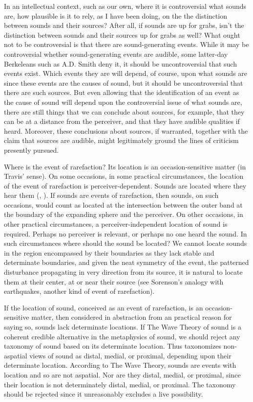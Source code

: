 \documentclass[12pt]{article}
\begin{document}
In an intellectual context, such as our own, where it is controversial what sounds are, how plausible is it to rely, as I have been doing, on the the distinction between sounds and their sources? After all, if sounds are up for grabs, isn’t the distinction between sounds and their sources up for grabs as well? What ought not to be controversial is that there are sound-generating events. While it may be controversial whether sound-generating events are audible, some latter-day Berkeleans such as A.D. Smith \citeyearpar{Smith:2002sa} deny it, it should be uncontroversial that such events exist. Which events they are will depend, of course, upon what sounds are since these events are the causes of sound, but it should be uncontroversial that there are such sources. But even allowing that the identification of an event as the cause of sound will depend upon the controversial issue of what sounds are, there are still things that we can conclude about sources, for example, that they can be at a distance from the perceiver, and that they have audible qualities if heard. Moreover, these conclusions about sources, if warranted, together with the claim that sources are audible, might legitimately ground the lines of criticism presently pursued. 

Where is the event of rarefaction? Its location is an occasion-sensitive matter (in Travis' \citeyear{Travis:2008la} sense). On some occasions, in some practical circumstances, the location of the event of rarefaction is perceiver-dependent. Sounds are located where they hear them (\citealt{Nudds:2009sf}, \citealt{OShaughnessy:2009aa}). If sounds are events of rarefaction, then sounds, on such occasions, would count as located at the intersection between the outer band at the boundary of the expanding sphere and the perceiver. On other occasions, in other practical circumstances, a perceiver-independent location of sound is required. Perhaps no perceiver is relevant, or perhaps no one heard the sound. In such circumstances where should the sound be located? We cannot locate sounds in the region encompassed by their boundaries as they lack stable and determinate boundaries, and given the neat symmetry of the event, the patterned disturbance propagating in very direction from its source, it is natural to locate them at their center, at or near their source (see Sorenson's \citeyear{Sorensen:2009aa} analogy with earthquakes, another kind of event of rarefaction).

If the location of sound, conceived as an event of rarefaction, is an occasion-sensitive matter, then considered in abstraction from an practical reason for saying so, sounds lack determinate locations. If The Wave Theory of sound is a coherent credible alternative in the metaphysics of sound, we should reject any taxonomy of sound based on its determinate location. Thus \citet{Casati:2014hw} taxonomizes non-aspatial views of sound as distal, medial, or proximal, depending upon their determinate location. According to The Wave Theory, sounds are events with location and so are not aspatial. Nor are they distal, medial, or proximal, since their location is not determinately distal, medial, or proximal. The taxonomy should be rejected since it unreasonably excludes a live possibility.
\end{document}
